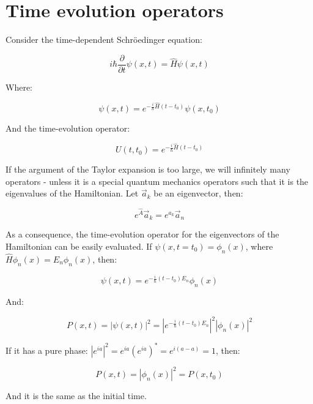 \section{Time evolution operators}
Consider the time-dependent Schr\"oedinger equation:

$$i\hbar\frac{\partial}{\partial t}\psi(x,t) = \hat{H}\psi(x,t)$$

Where:

$$\psi(x,t) = e^{-\frac{i}{\hbar}\hat{H}(t-t_0)}\psi(x,t_0)$$

And the time-evolution operator:

$$U(t,t_0) = e^{-\frac{i}{\hbar}\hat{H}(t-t_0)}$$

If the argument of the Taylor expansion is too large, we will infinitely many operators - unless it is a special quantum mechanics operators such that it is the eigenvalues of the Hamiltonian.
Let $\vec{a}_k$ be an eigenvector, then:

$$e^{\hat{A}}\vec{a}_k = e^{a_k}\vec{a}_n$$

As a consequence, the time-evolution operator for the eigenvectors of the Hamiltonian can be easily evaluated.
If $\psi(x,t=t_0) = \phi_n(x)$, where $\hat{H}\phi_n(x) = E_n\phi_n(x)$, then:

$$\psi(x,t) = e^{-\frac{i}{\hbar}(t-t_0)E_n}\phi_n(x)$$

And:

$$P(x,t) = |\psi(x,t)|^2 = |e^{-\frac{i}{\hbar}(t-t_0)E_n}|^2|\phi_n(x)|^2$$

If it has a pure phase: $|e^{ia}|^2 = e^{ia}(e^{ia})^* = e^{i(a-a)} = 1$, then:

$$P(x,t) = |\phi_n(x)|^2 = P(x,t_0)$$

And it is the same as the initial time.
